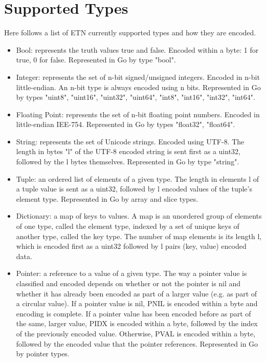 \section{Supported Types}

Here follows a list of ETN currently supported types and how they are encoded.

\begin{itemize}

	\item Bool: represents the truth values true and false. Encoded within a byte: 1 for true, 0 for false. Represented in Go by type "bool".
	
	\item Integer: represents the set of n-bit signed/unsigned integers. Encoded in n-bit little-endian. An n-bit type is always encoded using n bits. Represented in Go by types "uint8", "uint16", "uint32", "uint64", "int8", "int16", "int32", "int64".
	
	\item Floating Point: represents the set of n-bit floating point numbers. Encoded in little-endian IEE-754. Represented in Go by types "float32", "float64".
	
	\item String: represents the set of Unicode strings. Encoded using UTF-8. The length in bytes "l" of the UTF-8 encoded string is sent first as a uint32, followed by the l bytes themselves. Represented in Go by type "string".
	
	\item Tuple: an ordered list of elements of a given type. The length in elements l of a tuple value is sent as a uint32, followed by l encoded values of the tuple's element type. Represented in Go by array and slice types.
	
	\item Dictionary: a map of keys to values. A map is an unordered group of elements of one type, called the element type, indexed by a set of unique keys of another type, called the key type. The number of map elements is its length l, which is encoded first as a uint32 followed by l pairs (key, value) encoded data.
	
	\item Pointer: a reference to a value of a given type. The way a pointer value is classified and encoded depends on whether or not the pointer is nil and whether it has already been encoded as part of a larger value (e.g. as part of a circular value).
	If a pointer value is nil, PNIL is encoded within a byte and encoding is complete.
	If a pointer value has been encoded before as part of the same, larger value, PIDX is encoded within a byte, followed by the index of the
previously encoded value.
Otherwise, PVAL is encoded within a byte, followed by the encoded value that the pointer references.
Represented in Go by pointer types.


\end{itemize}
